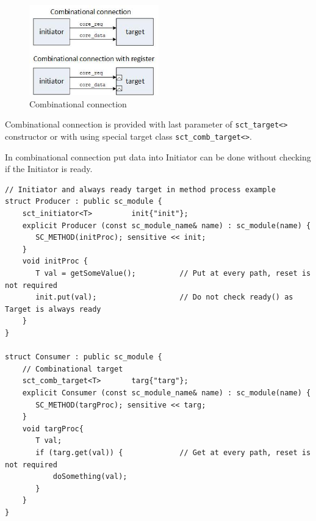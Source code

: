 \begin{figure}[!htb]
\centering
\includegraphics[width=0.5\textwidth]{pics/ss_comb_conn.jpg}
\caption{Combinational connection}
\label{fig:ss_usage}
\end{figure}

Combinational connection is provided with last parameter of {\tt sct\_target<>} constructor or with using special target class {\tt sct\_comb\_target<>}.

In combinational connection put data into Initiator can be done without checking if the Initiator is ready.

\begin{lstlisting}[style=mycpp]
// Initiator and always ready target in method process example
struct Producer : public sc_module {
    sct_initiator<T>         init{"init"};
    explicit Producer (const sc_module_name& name) : sc_module(name) {
       SC_METHOD(initProc); sensitive << init;
    } 
    void initProc {
       T val = getSomeValue();          // Put at every path, reset is not required 
       init.put(val);                   // Do not check ready() as Target is always ready
    }						   
}

struct Consumer : public sc_module {
    // Combinational target
    sct_comb_target<T>       targ{"targ"};   
    explicit Consumer (const sc_module_name& name) : sc_module(name) {
       SC_METHOD(targProc); sensitive << targ;
    } 
    void targProc{
       T val;
       if (targ.get(val)) {             // Get at every path, reset is not required
           doSomething(val);        
       }
    }
}
\end{lstlisting}

